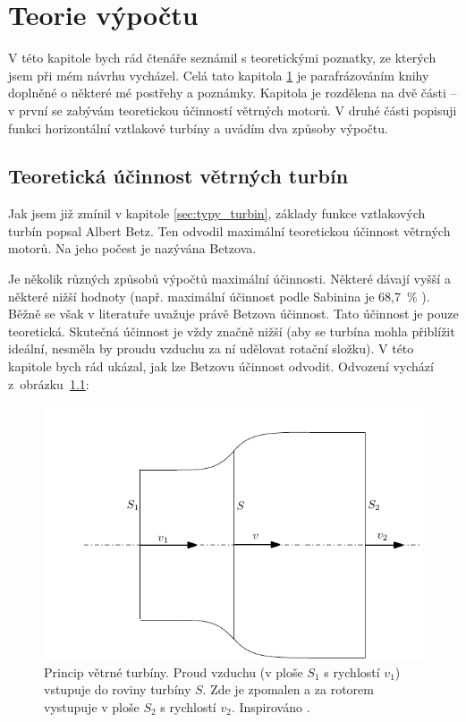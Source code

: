 \chapter{Teorie výpočtu}
\label{kap:teorie}
	V této kapitole bych rád čtenáře seznámil s teoretickými poznatky, ze kterých jsem při mém návrhu vycházel. Celá tato kapitola \ref{kap:teorie} je parafrázováním knihy \cite{Rychetnik:Motory} doplněné o některé mé postřehy a poznámky. Kapitola je rozdělena na dvě části – v první se zabývám teoretickou účinností větrných motorů. V druhé části popisuji funkci horizontální vztlakové turbíny a uvádím dva způsoby výpočtu.
	
	\section{Teoretická účinnost větrných turbín}\label{ucinnost}
	Jak jsem již zmínil v kapitole \ref{sec:typy_turbin}, základy funkce vztlakových turbín popsal Albert Betz. Ten odvodil maximální teoretickou účinnost větrných motorů. Na jeho počest je nazývána Betzova.
	
	Je několik různých způsobů výpočtů maximální účinnosti. Některé dávají vyšší a některé nižší hodnoty (např. maximální účinnost podle Sabinina je 68,7~\% \cite{Rychetnik:Motory}). Běžně se však v literatuře uvažuje právě Betzova účinnost. Tato účinnost je pouze teoretická. Skutečná účinnost je vždy značně nižší (aby se turbína mohla přiblížit ideální, nesměla by proudu vzduchu za ní udělovat rotační složku).
	V této kapitole bych rád ukázal, jak lze Betzovu účinnost odvodit. Odvození vychází z~obrázku~\ref{obr.rotor}:
	\begin{figure}[H]
		\centering
			\includegraphics[]{obrazky/rotor}
		\caption{Princip větrné turbíny. Proud vzduchu (v ploše $S_1$ s rychlostí $v_1$) vstupuje do roviny turbíny $S$. Zde je zpomalen a za rotorem vystupuje v ploše $S_2$ s rychlostí $v_2$. Inspirováno \cite{Rychetnik:Motory}.}
		\label{obr.rotor}
	  \end{figure}
	
